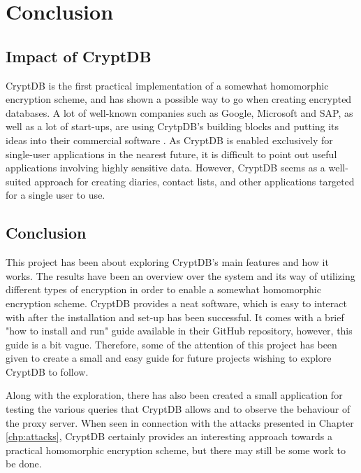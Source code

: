\chapter{Conclusion}
\label{chp:conclusion}

\section{Impact of CryptDB}

CryptDB is the first practical implementation of a somewhat homomorphic encryption scheme, and has shown a possible way to go when creating encrypted databases. A lot of well-known companies such as Google, Microsoft and SAP, as well as a lot of start-ups, are using CrytpDB's building blocks and putting its ideas into their commercial software \cite{cryptdb_homepage}. As CryptDB is enabled exclusively for single-user applications in the nearest future, it is difficult to point out useful applications involving highly sensitive data. However, CryptDB seems as a well-suited approach for creating diaries, contact lists, and other applications targeted for a single user to use.

\section{Conclusion}

This project has been about exploring CryptDB's main features and how it works. The results have been an overview over the system and its way of utilizing different types of encryption in order to enable a somewhat homomorphic encryption scheme. CryptDB provides a neat software, which is easy to interact with after the installation and set-up has been successful. It comes with a brief "how to install and run" guide available in their GitHub repository, however, this guide is a bit vague. Therefore, some of the attention of this project has been given to create a small and easy guide for future projects wishing to explore CryptDB to follow.

Along with the exploration, there has also been created a small application for testing the various queries that CryptDB allows and to observe the behaviour of the proxy server. When seen in connection with the attacks presented in Chapter \ref{chp:attacks}, CryptDB certainly provides an interesting approach towards a practical homomorphic encryption scheme, but there may still be some work to be done.


